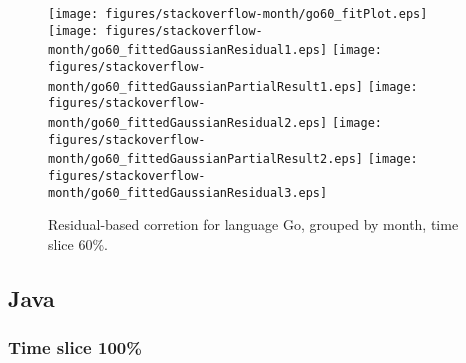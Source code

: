 \begin{figure}[hb]
\centering
{}
{\texttt{[image: figures/stackoverflow-month/go60\_fitPlot.eps]}}
{\texttt{[image: figures/stackoverflow-month/go60\_fittedGaussianResidual1.eps]}}
{\texttt{[image: figures/stackoverflow-month/go60\_fittedGaussianPartialResult1.eps]}}
{\texttt{[image: figures/stackoverflow-month/go60\_fittedGaussianResidual2.eps]}}
{\texttt{[image: figures/stackoverflow-month/go60\_fittedGaussianPartialResult2.eps]}}
{\texttt{[image: figures/stackoverflow-month/go60\_fittedGaussianResidual3.eps]}}
\caption{Residual-based corretion for language Go, grouped by month, time slice 60\%.}
\end{figure}


\clearpage 
\newpage 


\subsection{Java}

\FloatBarrier

\subsubsection{Time slice 100\%}


